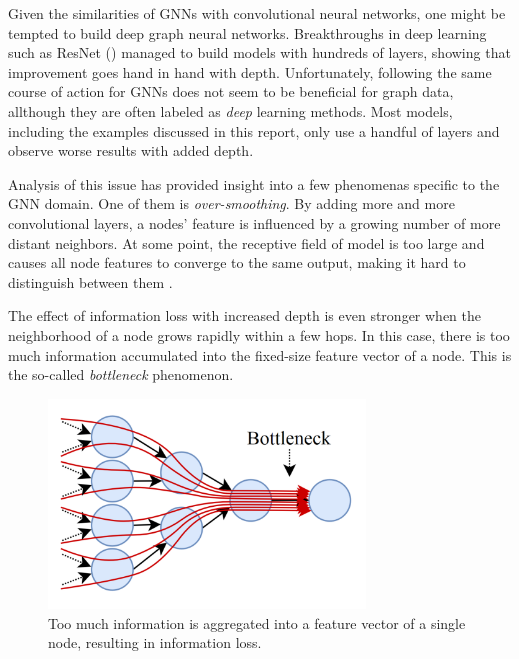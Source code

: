 \label{chapter:related_work}

Given the similarities of GNNs with convolutional neural networks, one might be tempted to build deep graph neural networks. Breakthroughs in deep learning such as ResNet (\cite{he2015deep}) managed to build models with hundreds of layers, showing that improvement goes hand in hand with depth. Unfortunately, following the same course of action for GNNs does not seem to be beneficial for graph data, allthough they are often labeled as \textit{deep} learning methods. Most models, including the examples discussed in this report, only use a handful of layers and observe worse results with added depth.

Analysis of this issue has provided insight into a few phenomenas specific to the GNN domain. One of them is \textit{over-smoothing}. By adding more and more convolutional layers, a nodes' feature is influenced by a growing number of more distant neighbors. At some point, the receptive field of model is too large and causes all node features to converge to the same output, making it hard to distinguish between them \cite{oono2021graph}.

The effect of information loss with increased depth is even stronger when the neighborhood of a node grows rapidly within a few hops. In this case, there is too much information accumulated into the fixed-size feature vector of a node. This is the so-called \textit{bottleneck} phenomenon. 

\begin{figure}[h]
    \centering
    \includegraphics[width=0.75\textwidth]{img/bottleneck.png}
    \caption{Too much information is aggregated into a feature vector of a single node, resulting in information loss. \cite{alon2021bottleneck}}
    \label{fig:bottleneck}
\end{figure}

